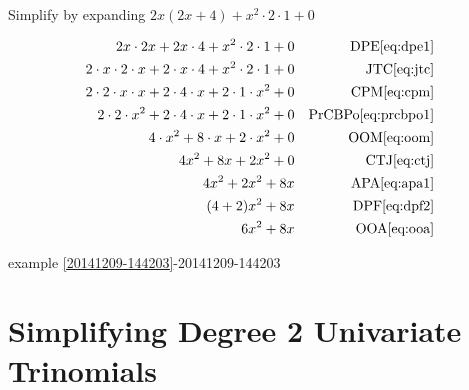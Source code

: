 \documentclass[20150903-160354-rs2.2-MarksMathNotebook.tex]{subfiles}
\begin{document}
\begin{example}[id:20141209-145211] \label{20141209-145211} \hfill \\

Simplify by expanding $2x(2x+4)+x^2 \cdot 2 \cdot 1 + 0$

\soln

\solnsteps
\begin{align*}
2x \cdot 2x + 2x \cdot 4 + x^2 \cdot 2 \cdot 1 + 0 && \text{DPE} \eqref{eq:dpe1} \\
2 \cdot x \cdot 2 \cdot x + 2 \cdot x \cdot 4 + x^2 \cdot 2 \cdot 1 + 0 && \text{JTC} \eqref{eq:jtc} \\
2 \cdot 2 \cdot x \cdot x + 2 \cdot 4 \cdot x + 2 \cdot 1 \cdot x^2 + 0 && \text{CPM} \eqref{eq:cpm} \\
2 \cdot 2 \cdot x^2 + 2 \cdot 4 \cdot x + 2 \cdot 1 \cdot x^2 + 0 && \text{PrCBPo} \eqref{eq:prcbpo1} \\
4 \cdot x^2 + 8 \cdot x + 2 \cdot x^2 + 0 && \text{OOM} \eqref{eq:oom} \\
4 x^2 +8x + 2x^2 + 0 && \text{CTJ} \eqref{eq:ctj} \\
4x^2 + 2x^2 + 8x && \text{APA} \eqref{eq:apa1} \\
(4+2)x^2 +8x && \text{DPF} \eqref{eq:dpf2} \\
6x^2+8x && \text{OOA} \eqref{eq:ooa}
\end{align*}

\qdepend

\qdependlist
example \ref{20141209-144203}-20141209-144203
\end{example}


\section{Simplifying Degree 2 Univariate Trinomials}\label{Simplifying Degree 2 Univariate Trinomials}
\end{document}
